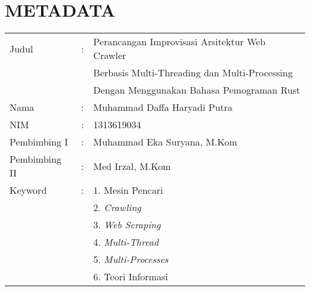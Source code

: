 \pagestyle{empty}
\chapter*{\centering \large METADATA}
\thispagestyle{empty}
\onehalfspacing{}

\vspace{2cm}
\noindent
\begin{tabular}{lcl}
	Judul	& :&  Perancangan Improvisasi Arsitektur Web Crawler\\
	& & Berbasis Multi-Threading dan Multi-Processing\\
	& & Dengan Menggunakan Bahasa Pemograman Rust \\
	Nama	& :&  Muhammad Daffa Haryadi Putra \\
	NIM	& :&  1313619034 \\
	Pembimbing I	& :&  Muhammad Eka Suryana, M.Kom \\
	Pembimbing II	& :&  Med Irzal, M.Kom \\
	Keyword	& :& 1. Mesin Pencari \\
  & & 2. \emph{Crawling} \\
  & & 3. \emph{Web Scraping} \\
  & & 4. \emph{Multi-Thread} \\
  & & 5. \emph{Multi-Processes} \\
	& & 6. Teori Informasi
\end{tabular}
\vspace{0.5cm}
